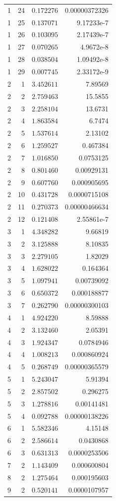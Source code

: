 \documentclass[12pt]{amsart}
\theoremstyle{remark}
\theoremstyle{definition}
\numberwithin{equation}{section}
\begin{document}
\begin{longtable}{rrrr}
1 & 24 & $0.172276$ & 0.00000372326 \\
1 & 25 & $0.137071$ & 9.17233e-7 \\
1 & 26 & $0.103095$ & 2.17439e-7 \\
1 & 27 & $0.070265$ & 4.9672e-8 \\
1 & 28 & $0.038504$ & 1.09492e-8 \\
1 & 29 & $0.007745$ & 2.33172e-9 \\
2 & 1 & $3.452611$ & 7.89569 \\
2 & 2 & $2.759463$ & 15.5855 \\
2 & 3 & $2.258104$ & 13.6731 \\
2 & 4 & $1.863584$ & 6.7474 \\
2 & 5 & $1.537614$ & 2.13102 \\
2 & 6 & $1.259527$ & 0.467384 \\
2 & 7 & $1.016850$ & 0.0753125 \\
2 & 8 & $0.801460$ & 0.00929131 \\
2 & 9 & $0.607760$ & 0.000905695 \\
2 & 10 & $0.431728$ & 0.0000715108 \\
2 & 11 & $0.270373$ & 0.00000466634 \\
2 & 12 & $0.121408$ & 2.55861e-7 \\
3 & 1 & $4.348282$ & 9.66819 \\
3 & 2 & $3.125888$ & 8.10835 \\
3 & 3 & $2.279105$ & 1.82029 \\
3 & 4 & $1.628022$ & 0.164364 \\
3 & 5 & $1.097941$ & 0.00739092 \\
3 & 6 & $0.650372$ & 0.000188877 \\
3 & 7 & $0.262790$ & 0.00000300103 \\
4 & 1 & $4.924220$ & 8.59888 \\
4 & 2 & $3.132460$ & 2.05391 \\
4 & 3 & $1.924347$ & 0.0784946 \\
4 & 4 & $1.008213$ & 0.000860924 \\
4 & 5 & $0.268749$ & 0.00000365579 \\
5 & 1 & $5.243047$ & 5.91394 \\
5 & 2 & $2.857502$ & 0.296275 \\
5 & 3 & $1.278816$ & 0.00141481 \\
5 & 4 & $0.092788$ & 0.00000138226 \\
6 & 1 & $5.582346$ & 4.15148 \\
6 & 2 & $2.586614$ & 0.0430868 \\
6 & 3 & $0.631313$ & 0.0000253506 \\
7 & 2 & $1.143409$ & 0.000600804 \\
8 & 2 & $1.275464$ & 0.000195603 \\
9 & 2 & $0.520141$ & 0.0000107957 \\
\end{longtable}
\endgroup
\end{document}
